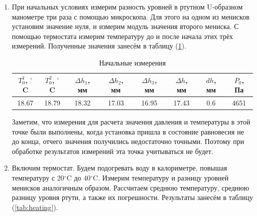 \documentclass[a4paper,12pt]{article} %
\begin{document}
\begin{enumerate}
  \item При начальных условиях измерим разность уровней в ртутном U-образном манометре три раза с помощью микроскопа. 
  Для этого на одном из менисков установим значение нуля, и измерим модуль значения второго мениска. 
  С помощью термостата измерим температуру до и после начала этих трёх измерений. 
  Полученные значения занесём в таблицу (\ref{tab:init}). 

  \begin{table}[h]
    \caption{Начальные измерения}
    \centering
        \begin{tabular}{|c|c|c|c|c|c|c|c|}
    \hline $T_{0}^1$, $^\circ$C & $T_{0}^2$, $^\circ$C & $\Delta h_1$, мм & $\Delta h_2$, мм & $\Delta h_3$, мм & $\Delta h$, мм & $dh$, мм & $P_{0}$, Па  \\
    \hline  18.67 & 18.79 & 18.32 & 17.03 & 16.95 & 17.43 & 0.6 & 4651\\
    \hline
\end{tabular}
    \label{tab:init}
\end{table}

  Заметим, что измерения для расчета значения давления и температуры в этой точке были выполнены, 
  когда установка пришла в состояние равновесия не до конца, отчего значения получились недостаточно точными. 
  Поэтому при обработке результатов измерений эта точка учитываться не будет.

  \item Включим термостат. 
  Будем подогревать воду в калориметре, повышая температуру с 20$^\circ$C до 40$^\circ$C. 
  Измерим температуру и разницу уровней менисков аналогичным образом. 
  Рассчитаем среднюю температуру, среднюю разницу уровня ртути, а также их погрешности. 
  Результаты занесём в таблицу (\ref{tab:heating}).


\end{enumerate}
\end{document}
